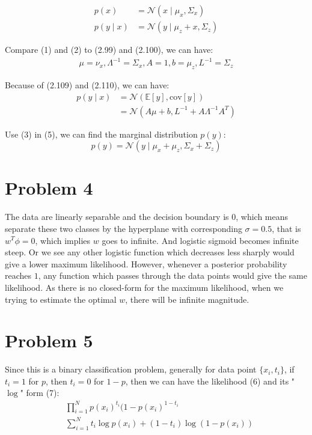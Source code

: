 \documentclass[twoside,11pt]{homework}
\begin{document}
	\begin{align}
	p(x) &= \mathcal{N} (x \mid \mu_x, \Sigma_x)\\
	p(y \mid x) &= \mathcal{N} (y \mid \mu_z+x, \Sigma_z)
	\end{align}
	
Compare (1) and (2) to (2.99) and (2.100), we can have:
	\begin{align}
\mu=\nu_x, \Lambda^{-1}=\Sigma_x, A=1, b=\mu_z, L^{-1}=\Sigma_z
	\end{align}
	
Because of (2.109) and (2.110), we can have:
	\begin{align}
		p(y \mid x) &= \mathcal{N} (\mathbb{E}[y], \mathrm{cov}[y])\\
		&= \mathcal{N} (A\mu+b, L^{-1}+A\Lambda^{-1}A^T)
	\end{align}

Use (3) in (5), we can find the marginal distribution $p(y)$:
$$p(y)= \mathcal{N} (y \mid \mu_x+\mu_z, \Sigma_x+\Sigma_z)$$

\section*{Problem 4}

The data are linearly separable and the decision boundary is 0, which means separate these two classes by the hyperplane with corresponding $\sigma = 0.5$, that is $w^T\phi=0$, which implies $w$ goes to infinite. And logistic sigmoid becomes infinite steep. Or we see any other logistic function which decreases less sharply would give a lower maximum likelihood. However, whenever a posterior probability reaches $1$, any function which passes through the data points would give the same likelihood. As there is no closed-form for the maximum likelihood,  when we trying to estimate the optimal $w$, there will be infinite magnitude.

\section*{Problem 5}

Since this is a binary classification problem, generally for data point $\{x_i, t_i\}$, if $t_i=1$ for $p$, then $t_i=0$ for $1-p$, then we can have the likelihood (6) and its "$\log$" form (7):
	\begin{align}
	&\prod_{i=1}^N p(x_i)^{t_i}(1-p(x_i)^{1-t_i} \\
	&\sum_{i=1}^{N} t_i \log p(x_i) + (1-t_i) \log (1-p(x_i))
	\end{align}
	
\end{document}
